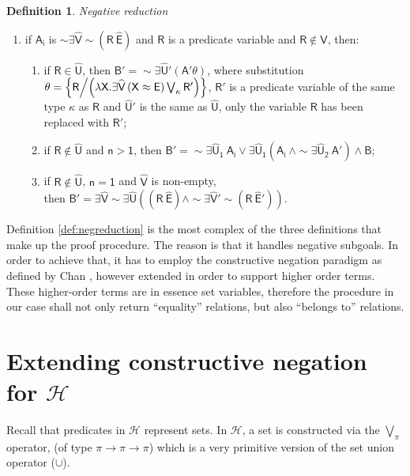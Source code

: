 \documentclass[inscr,ack,preface]{dithesis}
\theoremstyle{definition}
\newtheorem{definition}{Definition}[]
\newcommand{\h}{$\mathcal{H}$}
\newcommand{\msf}[1]{$\mathsf{#1}$}
\begin{document}
\begin{definition}{\emph{Negative reduction}}
\begin{enumerate}
  \item if \msf{A_i} is \msf{\sim \exists \widehat{V} \sim \left( R ~ \widehat{E} \right)} and \msf{R} is a predicate variable and \msf{R \not\in \widehat{V}}, then:
        \begin{enumerate}
          \item if \msf{R \in \widehat{U}},
                then \msf{B' = \sim \exists \widehat{U}' \left( A' \theta \right)},
                where substitution \\ \msf{\theta = \left\{ R \middle/ \left( \lambda X . \exists \widehat{V} \left( X \approx E \right) \bigvee_{\kappa} R' \right) \right\}},
                \msf{R'} is a predicate variable of the same type \msf{\kappa} as \msf{R} and \msf{\widehat{U}'} is the same as \msf{\widehat{U}}, only the variable \msf{R} has been replaced with \msf{R'};
          \item if \msf{R \not\in \widehat{U}} and \msf{n > 1},
                then \msf{B' = \sim \exists \widehat{U}_1 ~ A_i \lor \exists \widehat{U}_1 \left( A_i ~ \land \sim \exists \widehat{U}_2 ~ A' \right) \land B};
          \item if \msf{R \not\in \widehat{U}}, \msf{n = 1} and \msf{\widehat{V}} is non-empty, \\
                then \msf{B' = \exists \widehat{V} \sim \exists \widehat{U} \left( \left( R ~ \widehat{E} \right) \land \sim \exists \widehat{V}' \sim \left( R ~ \widehat{E}' \right) \right)}.
        \end{enumerate}
\end{enumerate}

Definition \ref{def:negreduction} is the most complex of the three definitions that make up the proof procedure. The reason is that it handles negative subgoals. In order to achieve that, it has to employ the constructive negation paradigm as defined by Chan \cite{DBLP:conf/slp/Chan89}, however extended in order to support higher order terms. These higher-order terms are in essence set variables, therefore the procedure in our case shall not only return ``equality'' relations, but also ``belongs to'' relations.
\end{definition}

\section{Extending constructive negation for \h{}}
Recall that predicates in \h{} represent sets. In \h{}, a set is constructed via the $\bigvee_{\pi}$ operator, (of type $\pi \rightarrow \pi \rightarrow \pi$) which is a very primitive version of the set union operator ($\cup$).
\end{document}

